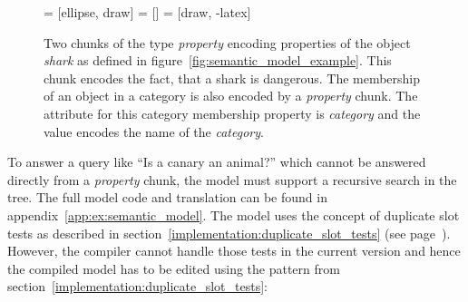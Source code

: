 \begin{figure}[htb]
\centering
{} = [ellipse, draw]
 = [] 
 = [draw, -latex]   
\qquad
{}
\caption{Two chunks of the type \emph{property} encoding properties of the object \emph{shark} as defined in figure~\ref{fig:semantic_model_example}.  This chunk encodes the fact, that a shark is dangerous.  The membership of an object in a category is also encoded by a \emph{property} chunk. The attribute for this category membership property is \emph{category} and the value encodes the name of the \emph{category}.}
\label{fig:semantic_model_example:chunks}
\end{figure}


To answer a query like ``Is a canary an animal?'' which cannot be answered directly from a \emph{property} chunk, the model must support a recursive search in the tree. The full model code and translation can be found in appendix~\ref{app:ex:semantic_model}. The model uses the concept of duplicate slot tests as described in section~\ref{implementation:duplicate_slot_tests} (see page~\pageref{implementation:duplicate_slot_tests}). However, the compiler cannot handle those tests in the current version and hence the compiled model has to be edited using the pattern from section~\ref{implementation:duplicate_slot_tests}:

